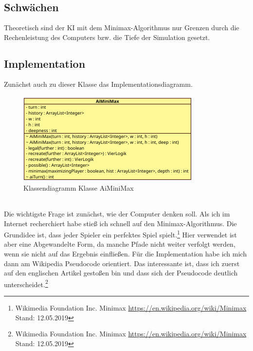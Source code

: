 \documentclass[12pt,a4paper]{article}
\begin{document}
	\subsection{Schwächen}
	Theoretisch sind der KI mit dem Minimax-Algorithmus nur Grenzen durch die Rechenleistung des Computers bzw. die Tiefe der Simulation gesetzt.
	
	\subsection{Implementation}
	Zunächst auch zu dieser Klasse das Implementationsdiagramm.
\begin{figure}[h]
	\centering
	\includegraphics[width=0.7\linewidth, height=0.3\textheight]{maybe/KlassendiagrammKI}
	\caption{Klassendiagramm Klasse AiMiniMax}
	\label{fig:klassendiagrammki}
\end{figure}
	\\Die wichtigste Frage ist zunächst, wie der Computer \glqq denken\grqq{} soll. Als ich im Internet recherchiert habe stieß ich schnell auf den Minimax-Algorithmus. Die Grundidee ist, dass jeder Spieler ein  \glqq perfektes\grqq{} Spiel spielt.\footnote{Wikimedia Foundation Inc. \glqq Minimax\grqq{} \url{https://en.wikipedia.org/wiki/Minimax} Stand: 12.05.2019} Hier verwendet ist aber eine Abgewandelte Form, da manche Pfade nicht weiter verfolgt werden, wenn sie nicht auf das Ergebnis einfließen. Für die Implementation habe ich mich dann am Wikipedia Pseudocode orientiert. Das interessante ist, dass ich zuerst auf den englischen Artikel gestoßen bin und dass sich der Pseudocode deutlich unterscheidet.\footnote{Wikimedia Foundation Inc. \glqq Minimax\grqq{} \url{https://en.wikipedia.org/wiki/Minimax} Stand: 12.05.2019}\\
\end{document}
